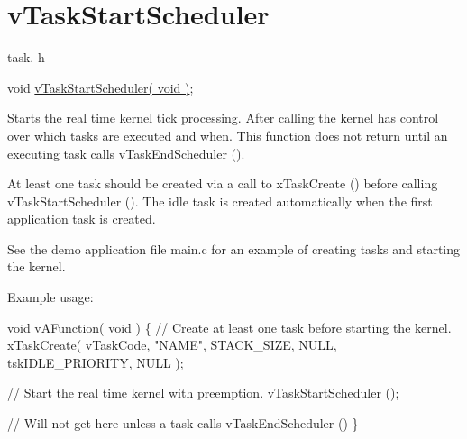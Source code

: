 \hypertarget{group__vTaskStartScheduler}{}\section{v\+Task\+Start\+Scheduler}
\label{group__vTaskStartScheduler}
task. h 
\begin{DoxyPre}void \hyperlink{task_8h_aaf9dca1065c60abdeb309d56ab7293cb}{vTaskStartScheduler( void )};\end{DoxyPre}


Starts the real time kernel tick processing. After calling the kernel has control over which tasks are executed and when. This function does not return until an executing task calls v\+Task\+End\+Scheduler ().

At least one task should be created via a call to x\+Task\+Create () before calling v\+Task\+Start\+Scheduler (). The idle task is created automatically when the first application task is created.

See the demo application file main.\+c for an example of creating tasks and starting the kernel.

Example usage\+: 
\begin{DoxyPre}
void vAFunction( void )
\{
    // Create at least one task before starting the kernel.
    xTaskCreate( vTaskCode, "NAME", STACK\_SIZE, NULL, tskIDLE\_PRIORITY, NULL );\end{DoxyPre}



\begin{DoxyPre}    // Start the real time kernel with preemption.
    vTaskStartScheduler ();\end{DoxyPre}



\begin{DoxyPre}    // Will not get here unless a task calls vTaskEndScheduler ()
\}
  \end{DoxyPre}
 
